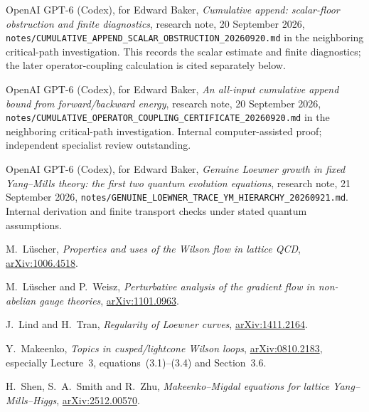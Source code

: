 OpenAI GPT-6 (Codex), for Edward Baker,
\emph{Cumulative append: scalar-floor obstruction and finite diagnostics},
research note, 20 September 2026,
\nolinkurl{notes/CUMULATIVE_APPEND_SCALAR_OBSTRUCTION_20260920.md}
in the neighboring critical-path investigation.
This records the scalar estimate and finite diagnostics; the later
operator-coupling calculation is cited separately below.

OpenAI GPT-6 (Codex), for Edward Baker,
\emph{An all-input cumulative append bound from forward/backward energy},
research note, 20 September 2026,
\nolinkurl{notes/CUMULATIVE_OPERATOR_COUPLING_CERTIFICATE_20260920.md}
in the neighboring critical-path investigation.
Internal computer-assisted proof; independent specialist review outstanding.

OpenAI GPT-6 (Codex), for Edward Baker,
\emph{Genuine Loewner growth in fixed Yang--Mills theory: the first two
quantum evolution equations}, research note, 21 September 2026,
\nolinkurl{notes/GENUINE_LOEWNER_TRACE_YM_HIERARCHY_20260921.md}.
Internal derivation and finite transport checks under stated quantum assumptions.

M.~L\"uscher, \emph{Properties and uses of the Wilson flow in lattice QCD},
\href{https://arxiv.org/abs/1006.4518}{arXiv:1006.4518}.

M.~L\"uscher and P.~Weisz, \emph{Perturbative analysis of the gradient
flow in non-abelian gauge theories},
\href{https://arxiv.org/abs/1101.0963}{arXiv:1101.0963}.

J.~Lind and H.~Tran, \emph{Regularity of Loewner curves},
\href{https://arxiv.org/abs/1411.2164}{arXiv:1411.2164}.

Y.~Makeenko, \emph{Topics in cusped/lightcone Wilson loops},
\href{https://arxiv.org/abs/0810.2183}{arXiv:0810.2183},
especially Lecture~3, equations~(3.1)--(3.4) and Section~3.6.

H.~Shen, S.~A.~Smith and R.~Zhu,
\emph{Makeenko--Migdal equations for lattice Yang--Mills--Higgs},
\href{https://arxiv.org/abs/2512.00570}{arXiv:2512.00570}.
